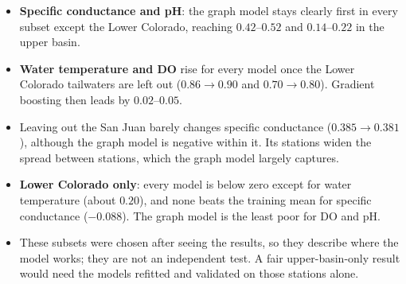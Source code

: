 \documentclass[12pt]{article}
\begin{document}
\begin{table}[H]
\centering
\small
\caption{LOO $R^2$ of the graph model on station subsets, with the best other model in
parentheses. Station counts in brackets. The Upper Colorado Basin is every subbasin above Lees
Ferry, i.e.\ all but the Lower Colorado.}
\label{tab:regions}
\end{table}

\begin{itemize}
  \item \textbf{Specific conductance and pH}: the graph model stays clearly first in every subset except the Lower Colorado,
        reaching $0.42$--$0.52$ and $0.14$--$0.22$ in the upper basin.
  \item \textbf{Water temperature and DO} rise for every model once the Lower Colorado tailwaters
        are left out ($0.86 \to 0.90$ and $0.70 \to 0.80$). Gradient boosting then leads by
        $0.02$--$0.05$.
  \item Leaving out the San Juan barely changes specific conductance ($0.385 \to 0.381$), although
        the graph model is negative within it. Its stations widen the spread between stations,
        which the graph model largely captures.
  \item \textbf{Lower Colorado only}: every model is below zero except for water temperature
        (about $0.20$), and none beats the training mean for specific conductance ($-0.088$). The
        graph model is the least poor for DO and pH.
  \item These subsets were chosen after seeing the results, so they describe where the model
        works; they are not an independent test. A fair upper-basin-only result would need the
        models refitted and validated on those stations alone.
\end{itemize}
\end{document}
